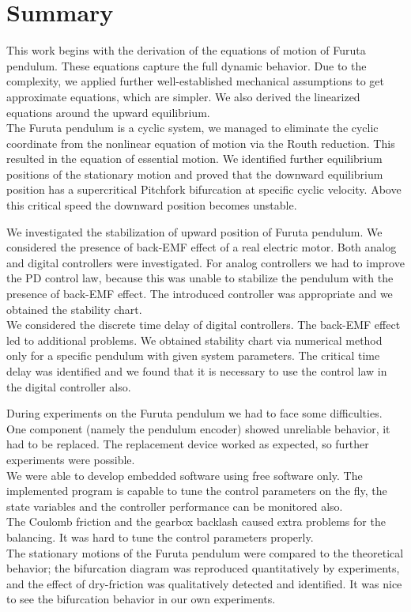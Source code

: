 \chapter{Summary}\label{chap:summary}

\vspace{2.5eM}

This work begins with the derivation of the equations of motion of Furuta pendulum. These equations capture the full dynamic behavior. Due to the complexity, we applied further well-established mechanical assumptions to get approximate equations, which are simpler. We also derived the linearized equations around the upward equilibrium.
\\
The Furuta pendulum is a cyclic system, we managed to eliminate the cyclic coordinate from the nonlinear equation of motion via the Routh reduction. 
This resulted in the equation of essential motion. 
We identified further equilibrium positions of the stationary motion and proved that the downward equilibrium position has a supercritical Pitchfork bifurcation at specific cyclic velocity. 
Above this critical speed the downward position becomes unstable.

We investigated the stabilization of upward position of Furuta pendulum. 
We considered the presence of back-EMF effect of a real electric motor. 
Both analog and digital controllers were investigated. For analog controllers we had to improve the PD control law, because this was unable to stabilize the pendulum with the presence of back-EMF effect. The introduced \PDD{} controller was appropriate and we obtained the stability chart.
\\
We considered the discrete time delay of digital controllers. 
The back-EMF effect led to additional problems.
We obtained stability chart via numerical method only for a specific pendulum with given system parameters. The critical time delay was identified and we found that it is necessary to use the \PDD{} control law in the digital controller also.

During experiments on the Furuta pendulum we had to face some difficulties. One component (namely the pendulum encoder) showed unreliable behavior, it had to be replaced. The replacement device worked as expected, so further experiments were possible. \\
We were able to develop embedded software using free software only. The implemented program is capable to tune the control parameters on the fly, the state variables and the controller performance can be monitored also.\\
The Coulomb friction and the gearbox backlash caused extra problems for the balancing. It was hard to tune the control parameters properly. 
\\
The stationary 
motions
of the Furuta pendulum were compared to the theoretical behavior;
the bifurcation diagram was reproduced quantitatively by experiments, and the effect of
dry-friction was qualitatively 
detected and identified. 
It was nice to see the bifurcation behavior in our
own experiments.
